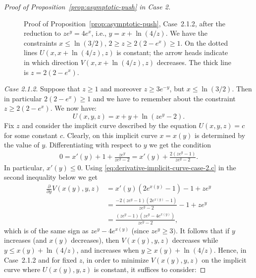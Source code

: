 \documentclass[a4paper]{amsart} %
\theoremstyle{definition}
\theoremstyle{remark}
\numberwithin{equation}{section}
\newcommand*{\XXXasymptoticDenominator}{V}
\newcommand*{\XXXasymptoticNominator}{U}
\begin{document}
\begin{proof}[Proof of Proposition~\ref{prop:asymptotic-push} in Case 2]
\begin{figure}[b]
		\caption{%
			Proof of Proposition~\ref{prop:asymptotic-push}, Case~2.1.2, after the reduction to $ze^y = 4e^x$,
			i.e., $y = x + \ln(4/z)$.
			We have the constraints $x\leq \ln(3/2)$, $2\geq z\geq 2(2-e^x) \geq 1$.
			On the dotted lines 
			$\XXXasymptoticNominator(x,x + \ln(4/z), z)$ is constant;
			the arrow heads indicate in which direction 
			$\XXXasymptoticDenominator(x,x + \ln(4/z), z)$ decreases.
			The thick line is $z = 2(2-e^x)$.
		}
		\label{fig:asymptotic-case-2.1.2-no-y}
	\end{figure}	



\emph{Case 2.1.2}.
	Suppose that $z \geq 1$ and moreover $z \geq 3e^{-y}$, but $x\leq \ln(3/2)$.
	Then in particular $2(2-e^x)\geq 1$ and we have to remember about the constraint $z\geq 2(2-e^x)$.
    We now have:
	\begin{equation*}
	\XXXasymptoticNominator(x,y,z) = x +  y + \ln(ze^y - 2).
	\end{equation*}
	Fix $z$ and consider the implicit curve described by the equation $\XXXasymptoticNominator(x,y,z) = c$ for some constant $c$. 
	Clearly, on this implicit curve
	$x=x(y)$ is determined by the value of $y$.
	Differentiating with respect to $y$ we
	get the condition
	\begin{align}
	\label{eq:derivative-implicit-curve-case-2.c}
	0 = x'(y)  + 1 + \frac{ze^y}{ze^y-2}
	= x'(y) + \frac{2(ze^y - 1
		)}{ze^y-2}.
	\end{align}
	In particular, $x'(y)\leq 0$.
	Using \eqref{eq:derivative-implicit-curve-case-2.c} in the second inequality below we get
	\begin{align*}
	\frac{\partial}{\partial y} \XXXasymptoticDenominator(x(y), y, z) 
	&= x'(y)(2e^{x(y)} - 1) - 1 + z e^y \\
	&= \frac{-2(ze^y -1)(2e^{x(y)} - 1)}{ze^y-2} - 1 + ze^{y}\\
	&= \frac{(ze^y -1)(ze^y - 4e^{x(y)})}{ze^y-2},
	\end{align*}
	which is of the same sign as $ze^y - 4e^{x(y)}$ (since $ze^{y} \geq 3)$.
	It follows that if $y$ increases (and  $x(y)$ decreases),
	then $\XXXasymptoticDenominator(x(y),y,z)$ decreases while $y\leq x(y) + \ln(4/z)$,
	and increases when $y \geq x(y) + \ln(4/z)$. 
	Hence, in Case~2.1.2 and for fixed $z$,  
	in order to minimize $\XXXasymptoticDenominator(x(y), y,z)$ on the implicit curve where $\XXXasymptoticNominator(x(y),y,z)$ is constant, it suffices to consider:

\end{proof}
\end{document}
